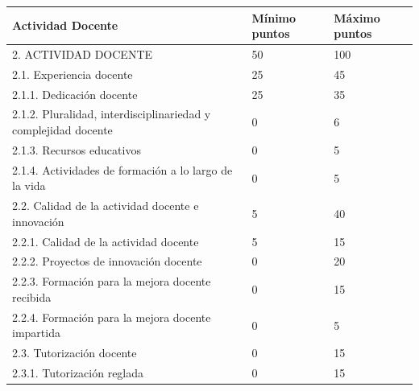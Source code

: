 \documentclass{article}
\begin{document}
\begin{itemize}
\begin{itemize}
\begin{scriptsize}
                  \vspace{0.4cm}
                  \begin{table}[h!]\centering\renewcommand{\arraystretch}{1.3}
                    \begin{tabular}{|p{}|p{}|p{}|}\hline
                      Actividad Docente                                                   & Mínimo puntos & Máximo puntos \\\hline
                      2. ACTIVIDAD DOCENTE                                                & 50            & 100           \\\hline
                      2.1. Experiencia docente                                            & 25            & 45            \\\hline
                      2.1.1. Dedicación docente                                           & 25            & 35            \\\hline
                      2.1.2. Pluralidad, interdisciplinariedad y complejidad docente      & 0             & 6             \\\hline
                      2.1.3. Recursos educativos                                          & 0             & 5             \\\hline
                      2.1.4. Actividades de formación a lo largo de la vida               & 0             & 5             \\\hline
                      2.2. Calidad de la actividad docente e innovación                   & 5             & 40            \\\hline
                      2.2.1. Calidad de la actividad docente                              & 5             & 15            \\\hline
                      2.2.2. Proyectos de innovación docente                              & 0             & 20            \\\hline
                      2.2.3. Formación para la mejora docente recibida                    & 0             & 15            \\\hline
                      2.2.4. Formación para la mejora docente impartida                   & 0             & 5             \\\hline
                      2.3. Tutorización docente                                           & 0             & 15            \\\hline
                      2.3.1. Tutorización reglada                                         & 0             & 15            \\\hline

\end{tabular}
\end{table}
\end{scriptsize}
\end{itemize}
\end{itemize}
\end{document}
